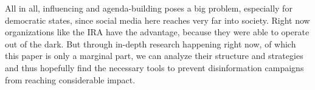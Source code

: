 \documentclass[12pt, titlepage=true, toc=bib]{scrartcl}
\begin{document}
All in all, influencing and agenda-building poses a big problem, especially for democratic states, since social media here reaches very far into society. Right now organizations like the IRA have the advantage, because they were able to operate out of the dark. But through in-depth research happening right now, of which this paper is only a marginal part, we can analyze their structure and strategies and thus hopefully find the necessary tools to prevent disinformation campaigns from reaching considerable impact.


\newpage

\printbibliography
\end{document}
